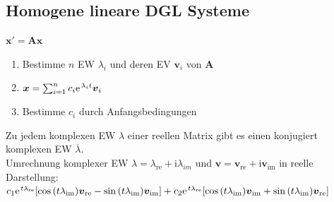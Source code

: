 \documentclass[6pt,a4paper]{scrartcl}
\let\olddot = \dot
\newcommand{\mat}[1]{\ensuremath{\begin{bmatrix} #1 \end{bmatrix}}}								%
\newcommand{\ma}[1]{\ensuremath{\boldsymbol {#1}}}												%
\newcommand{\vect}[1]{\ensuremath{\begin{pmatrix} #1 \end{pmatrix}}}							%
\newcommand{\svdots}{\ensuremath{\olddot :}}													%
\renewcommand{\vec}[1]{\ensuremath{\boldsymbol {#1}}}											%
\renewcommand*{\dot}[1]{\accentset{\mbox{\textrm{\large\bfseries .}} }{#1}}						%
\newcommand{\ol}[1]{\ensuremath{\overline{#1}}}									%
\newcommand{\ra}[0]{\ensuremath{\rightarrow}} 									%
\renewcommand{\i}{\ensuremath{\mathrm{i}}}										%
\newcommand{\R}{\ensuremath{\mathbb R}}
\begin{document}
\begin{multicols*}{4}
\subsection{Homogene lineare DGL Systeme}




$\boxed{\vec x'= \ma A\vec x}$
\begin{enumerate}
	\item Bestimme $n$ EW $\lambda_i$ und deren EV $\vec v_i$ von $\ma A$
	\item $\vec x = \sum_{i=1}^n c_i\e^{\lambda_it}\vec v_i$
	\item Bestimme $c_i$ durch Anfangsbedingungen
	
\end{enumerate}
Zu jedem komplexen EW $\lambda$ einer reellen Matrix gibt es einen konjugiert komplexen EW $\ol \lambda$.\\
Umrechnung komplexer EW $\lambda = \lambda_{\text{re}}+ \i \lambda_{im}$ und $\vec v = \vec v_{\text{re}} + \i \vec v_{\text{im}}$ in reelle Darstellung: \\
$c_1 \e^{t\lambda_{\text{re}}}[\cos{(t\lambda_{\text{im}})}\vec v_{\text{re}} - \sin{(t\lambda_{\text{im}})}\vec v_{\text{im}}]+c_2\e^{t\lambda_{\text{re}}}[\cos{(t\lambda_{\text{im}})}\vec v_{\text{im}}+\sin{(t\lambda_{\text{im}})}\vec v_{\text{re}}]$


\end{multicols*}
\end{document}
